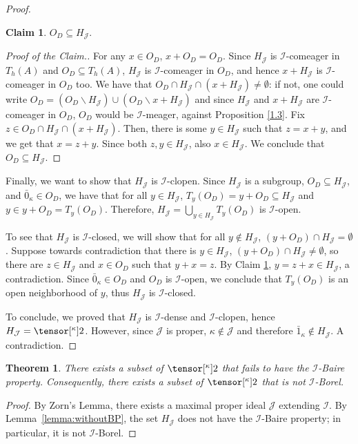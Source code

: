 \documentclass{amsart}
\numberwithin{equation}{section}
\newcommand{\I}{\mathcal{I}}
\newcommand{\pre}[2]{\tensor[^{#1}]{#2}{}}
\newcommand{\1}{\mathbf{I}}
\newcommand{\2}{\mathbf{II}}
\renewcommand{\k}{\kappa}
\newtheorem{theorem}{Theorem}[section]
\theoremstyle{definition}
\newtheorem{claim}{Claim}[theorem]
\theoremstyle{remark}
\begin{document}
\begin{proof}
    \begin{claim}\label{O_open}
        $O_D \subseteq H_\mathcal{J}$.
    \end{claim}
    \begin{proof}[Proof of the Claim.]
        For any $x \in O_D$, $x+O_D=O_D$. Since $H_\mathcal{J}$ is $\mathcal{I}$-comeager in $T_h(A)$ and $O_D\subseteq T_h(A)$, $H_\mathcal{J}$ is $\mathcal{I}$-comeager in $O_D$, and hence $x+H_\mathcal{J}$ is $\mathcal{I}$-comeager in $O_D$ too.
        We have that $O_D\cap H_\mathcal{J}\cap (x+H_\mathcal{J})\neq \emptyset$: if not, one could write $O_D=(O_D\backslash H_\mathcal{J})\cup (O_D\backslash x+H_\mathcal{J})$ and since $H_\mathcal{J}$ and $x+H_\mathcal{J}$ are $\mathcal{I}$-comeager in $O_D$, $O_D$ would be $\mathcal{I}$-meager, against Proposition \ref{1.3}.
        Fix $z\in O_D\cap H_\mathcal{J}\cap (x+H_\mathcal{J})$. Then, there is some $y\in H_\mathcal{J}$ such that $z=x+y$, and we get that $x=z+y$. Since both $z,y\in H_\mathcal{J}$, also $x\in H_\mathcal{J}$. We conclude that $O_D\subseteq H_\mathcal{J}$.
    \end{proof}
Finally, we want to show that $H_\mathcal{J}$ is $\mathcal{I}$-clopen. 
Since $H_\mathcal{J}$ is a subgroup, $O_D\subseteq H_\mathcal{J}$, and $\bar 0_\kappa\in O_D$, we have that for all $y\in H_\mathcal{J}$, $T_y(O_D)=y+ O_D\subseteq H_\mathcal{J}$ and $y\in y+ O_D=T_y(O_D)$. Therefore, $H_\mathcal{J}=\bigcup_{y\in H_\mathcal{J}} T_y(O_D)$ is $\mathcal{I}$-open.

To see that $H_\mathcal{J}$ is $\mathcal{I}$-closed, we will show that for all $y\notin H_\mathcal{J}$, $(y+ O_D)\cap H_\mathcal{J}=\emptyset$.
Suppose towards contradiction that there is $y\in H_\mathcal{J}$, $(y+ O_D)\cap H_\mathcal{J}\neq\emptyset$, so there are $z\in H_\mathcal{J}$ and $x\in O_D$  such that $y+x=z$. By Claim \ref{O_open}, $y=z+x \in H_\mathcal{J}$, a contradiction.  Since $\bar0_\kappa\in O_D$ and $O_D$ is $\mathcal{I}$-open, we conclude that $T_y(O_D)$ is an open neighborhood of $y$, thus $H_\mathcal{J}$ is $\mathcal{I}$-closed.

To conclude, we proved that $H_\mathcal{J}$ is $\mathcal{I}$-dense and $\mathcal{I}$-clopen, hence $H_\mathcal{J}=\pre{\k}{2}$. However, since $\mathcal{J}$ is proper, $\kappa\notin \mathcal{J}$ and therefore $\bar 1_\kappa\notin H_\mathcal{J}$. A contradiction. 
\end{proof}

\begin{theorem}\label{thrm:withoutBP}
    There exists a subset of \(\pre{\k}{2}\) that fails to have the $\I$-Baire property. Consequently, there exists a subset of \(\pre{\k}{2}\) that is not \(\I\)-Borel.
\end{theorem}
\begin{proof}
    By Zorn's Lemma, there exists a maximal proper ideal $\mathcal{J}$ extending $\mathcal{I}$. By Lemma~\ref{lemma:withoutBP}, the set $H_\mathcal{J}$ does not have the $\mathcal{I}$-Baire property; in particular, it is not \(\I\)-Borel.
\end{proof}
\end{document}
